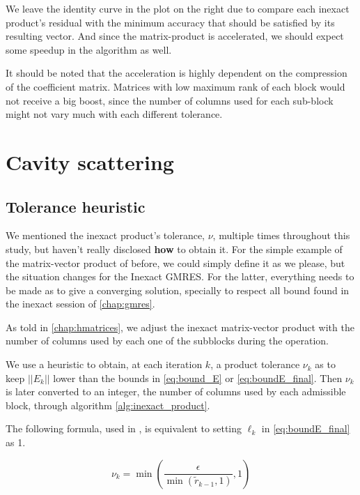 We leave the identity curve in the plot on the right due to compare each inexact product's residual with the minimum accuracy that should be satisfied by its resulting vector. And since the matrix-product is accelerated, we should expect some speedup in the algorithm as well.

It should be noted that the acceleration is highly dependent on the compression of the coefficient matrix. Matrices with low maximum rank of each block would not receive a big boost, since the number of columns used for each sub-block might not vary much with each different tolerance.



\section{Cavity scattering}

\subsection{Tolerance heuristic}

We mentioned the inexact product's tolerance, $\nu$, multiple times throughout this study, but haven't really disclosed \textbf{how} to obtain it. For the simple example of the matrix-vector product of before, we could simply define it as we please, but the situation changes for the Inexact GMRES. For the latter, everything needs to be made as to give a converging solution, specially to respect all bound found in the inexact session of \autoref{chap:gmres}.

As told in \autoref{chap:hmatrices}, we adjust the inexact matrix-vector product with the number of columns used by each one of the subblocks during the operation.

We use a heuristic to obtain, at each iteration $k$, a product tolerance $\nu_{k}$ as to keep $||E_{k}||$ lower than the bounds in \autoref{eq:bound_E} or \autoref{eq:boundE_final}. Then $\nu_{k}$ is later converted to an integer, the number of columns used by each admissible block, through algorithm \ref{alg:inexact_product}.

The following formula, used in \cite{wang2016inexactkryloviterationsrelaxation}, is equivalent to setting $\ell_{k}$ in \autoref{eq:boundE_final} as 1.

\begin{equation}\label{eq:gen_heuristics}
    \nu_{k} = \min \left(\frac{\epsilon}{\min(\tilde{r}_{k-1},1)},1 \right)
\end{equation}

